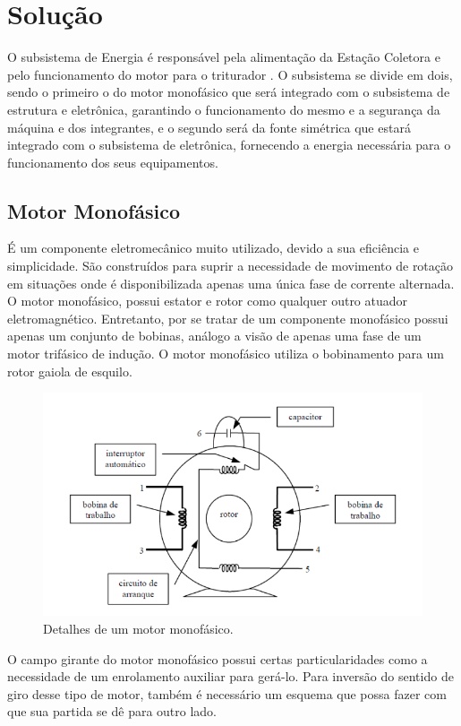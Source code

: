 \section{Solução}
O subsistema de Energia é responsável pela alimentação da Estação Coletora e pelo funcionamento do motor para o triturador . O subsistema se divide em dois, sendo o primeiro o do motor monofásico que será integrado com o subsistema de estrutura e eletrônica, garantindo o funcionamento do mesmo e a segurança da máquina e dos integrantes, e o segundo será da fonte simétrica que estará integrado com o subsistema de eletrônica, fornecendo a energia necessária para o funcionamento dos seus equipamentos.

\subsection{Motor Monofásico}
É um componente eletromecânico muito utilizado, devido a sua eficiência e simplicidade. São construídos para suprir a necessidade de movimento de rotação em situações onde é disponibilizada apenas uma única fase de corrente alternada. 
O motor monofásico, possui estator e rotor como qualquer outro atuador eletromagnético. Entretanto, por se tratar de um componente monofásico possui apenas um conjunto de bobinas, análogo a visão de apenas uma fase de um motor trifásico de indução. O motor monofásico utiliza o bobinamento para um rotor gaiola de esquilo.

\begin{figure}[!h]
	\centering
		\includegraphics[scale=0.6]{figuras/energia/1.png}
	\caption{Detalhes de um motor monofásico.}
\end{figure}

O campo girante do motor monofásico possui certas particularidades como a necessidade de um enrolamento auxiliar para gerá-lo. Para inversão do sentido de giro desse tipo de motor, também é necessário um esquema que possa fazer com que sua partida se dê para outro lado. 

